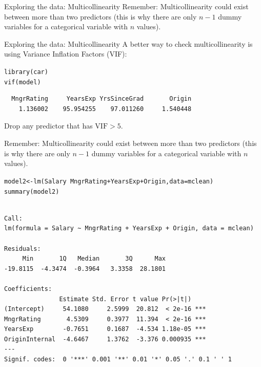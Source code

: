 \documentclass{beamer}\usepackage[]{graphicx}\usepackage[]{color}
\makeatletter
\newcommand{\hlopt}[1]{\textcolor[rgb]{1,0.894,0.769}{#1}}%
\newcommand{\hlstd}[1]{\textcolor[rgb]{1,0.894,0.769}{#1}}%
\newcommand{\hlkwb}[1]{\textcolor[rgb]{0.804,0.776,0.451}{#1}}%
\newcommand{\hlkwc}[1]{\textcolor[rgb]{0.78,0.941,0.545}{#1}}%
\newcommand{\hlkwd}[1]{\textcolor[rgb]{1,0.78,0.769}{#1}}%
\newenvironment{kframe}{%
 \def\at@end@of@kframe{}%
 \ifinner\ifhmode%
  \def\at@end@of@kframe{\end{minipage}}%
  \begin{minipage}{\columnwidth}%
 \fi\fi%
 \def\FrameCommand##1{\hskip\@totalleftmargin \hskip-\fboxsep
 \colorbox{shadecolor}{##1}\hskip-\fboxsep
     \hskip-\linewidth \hskip-\@totalleftmargin \hskip\columnwidth}%
 \MakeFramed {\advance\hsize-\width
   \@totalleftmargin\z@ \linewidth\hsize
   \@setminipage}}%
 {\par\unskip\endMakeFramed%
 \at@end@of@kframe}
\newenvironment{knitrout}{}{} %
\makeatother
\begin{document}
\begin{darkframes}
\begin{frame}[fragile]{Exploring the data: Multicollinearity}
      \alert{Remember:} Multicollinearity could exist between more than two predictors (this is why there are only $n-1$ dummy variables for a categorical variable with $n$ values).
\end{frame}

\begin{frame}[fragile]{Exploring the data: Multicollinearity}
      A better way to check multicollinearity is using Variance Inflation Factors (VIF):
\begin{knitrout}
\begin{kframe}
\begin{alltt}
\hlkwd{library}\hlstd{(car)}
\hlkwd{vif}\hlstd{(model)}
\end{alltt}
\begin{verbatim}
  MngrRating     YearsExp YrsSinceGrad       Origin 
    1.136002    95.954255    97.011260     1.540448 
\end{verbatim}
\end{kframe}
\end{knitrout}
      Drop any predictor that has $\text{VIF} > 5$.
      \pause  \bigskip

      \alert{Remember:} Multicollinearity could exist between more than two predictors (this is why there are only $n-1$ dummy variables for a categorical variable with $n$ values).
\end{frame}

\begin{frame}[fragile]%
      \fontsize{9}{9}\selectfont
\begin{knitrout}
\begin{kframe}
\begin{alltt}
\hlstd{model2} \hlkwb{<-} \hlkwd{lm}\hlstd{(Salary} \hlopt{~} \hlstd{MngrRating} \hlopt{+} \hlstd{YearsExp} \hlopt{+} \hlstd{Origin,} \hlkwc{data}\hlstd{=mclean)}
\hlkwd{summary}\hlstd{(model2)}
\end{alltt}
\begin{verbatim}

Call:
lm(formula = Salary ~ MngrRating + YearsExp + Origin, data = mclean)

Residuals:
     Min       1Q   Median       3Q      Max 
-19.8115  -4.3474  -0.3964   3.3358  28.1801 

Coefficients:
               Estimate Std. Error t value Pr(>|t|)    
(Intercept)     54.1080     2.5999  20.812  < 2e-16 ***
MngrRating       4.5309     0.3977  11.394  < 2e-16 ***
YearsExp        -0.7651     0.1687  -4.534 1.18e-05 ***
OriginInternal  -4.6467     1.3762  -3.376 0.000935 ***
---
Signif. codes:  0 '***' 0.001 '**' 0.01 '*' 0.05 '.' 0.1 ' ' 1


\end{verbatim}
\end{kframe}
\end{knitrout}
\end{frame}
\end{darkframes}
\end{document}
